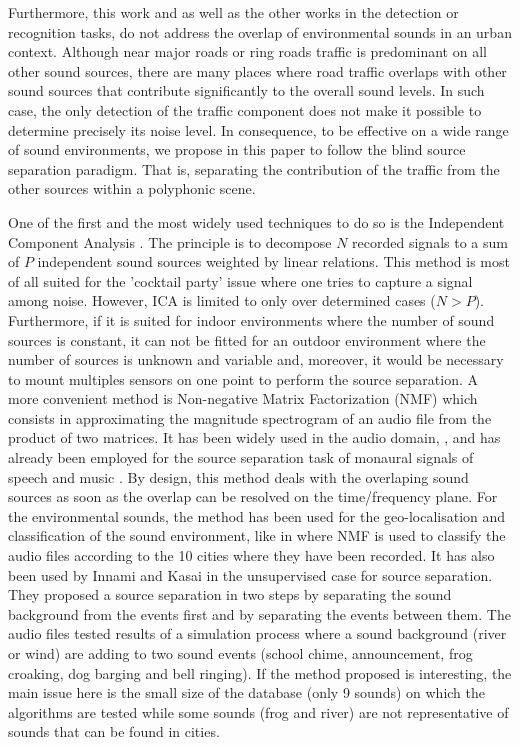 \documentclass[twocolumn,a4paper,10pt]{article}
\begin{document}
Furthermore, this work and as well as the other works in the detection or recognition tasks, do not address the overlap of environmental sounds in an urban context. Although near major roads or ring roads traffic is predominant on all other sound sources, there are many places where road traffic overlaps with other sound sources that contribute significantly to the overall sound levels. In such case, the only detection of the traffic component does not make it possible to determine precisely its noise level. In consequence, to be effective on a wide range of sound environments, we propose in this paper to follow the blind source separation paradigm. That is, separating the contribution of the traffic from the other sources within a polyphonic scene.


One of the first and the most widely used techniques to do so is the Independent Component Analysis \cite{comon_independent_1994}. The principle is to decompose $N$ recorded signals to a sum of $P$ independent sound sources weighted by linear relations. This method is most of all suited for the 'cocktail party' issue where one tries to capture a signal among noise.  However, ICA is limited to only over determined cases ($N > P$). Furthermore, if it is suited for indoor environments where the number of sound sources is constant, it can not be fitted for an outdoor environment where the number of sources is unknown and variable and, moreover, it would be necessary to mount multiples sensors on one point to perform the source separation. A more convenient method is Non-negative Matrix Factorization (NMF) \cite{lee_learning_1999} which consists in approximating the magnitude spectrogram of an audio file from the product of two matrices. It has been widely used in the audio domain, \cite{smaragdis_non-negative_2003} \cite{wilson_speech_2008} \cite{mesaros_sound_2015}, and has already been employed for the source separation task of monaural signals of speech and music \cite{wang_musical_2005} \cite{wilson_speech_2008}. By design, this method deals with the overlaping sound sources as soon as the overlap can be resolved on the time/frequency plane. For the environmental sounds, the method has been used for the geo-localisation and classification of the sound environment, like in \cite{kumar_audio_2016} where NMF is used to classify the audio files according to the 10 cities where they have been recorded. It has also been used by Innami and Kasai in the unsupervised case \cite{satoshi_innami_nmf-based_2012} for source separation. They proposed a source separation in two steps by separating the sound background from the events first and by separating the events between them. The audio files tested results of a simulation process where a sound background (river or wind) are adding to two sound events (school chime, announcement, frog croaking, dog barging and bell ringing). If the method proposed is interesting, the main issue here is the small size of the database (only 9 sounds) on which the algorithms are tested while some sounds (frog and river) are not representative of sounds that can be found in cities.
\end{document}
